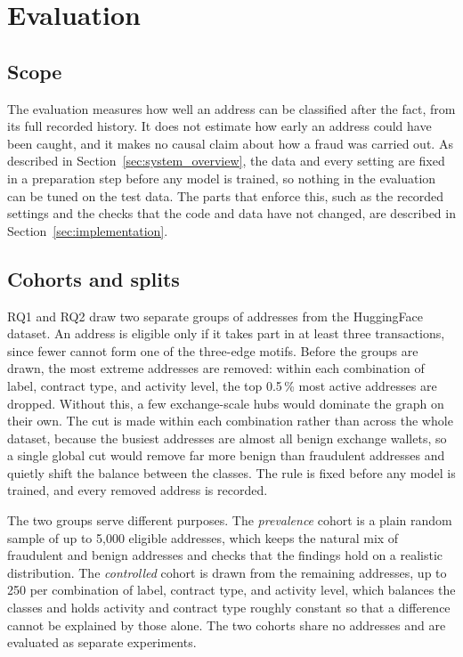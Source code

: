 \documentclass{thesisclass}
\begin{document}
\section{Evaluation}
\label{sec:evaluation_protocol}

\subsection{Scope}

The evaluation measures how well an address can be classified after the fact, from
its full recorded history. It does not estimate how early an address could have
been caught, and it makes no causal claim about how a fraud was carried out. As
described in Section~\ref{sec:system_overview}, the data and every setting are
fixed in a preparation step before any model is trained, so nothing in the
evaluation can be tuned on the test data. The parts that enforce this, such as the
recorded settings and the checks that the code and data have not changed, are
described in Section~\ref{sec:implementation}.

\subsection{Cohorts and splits}

RQ1 and RQ2 draw two separate groups of addresses from the HuggingFace dataset. An
address is eligible only if it takes part in at least three transactions, since
fewer cannot form one of the three-edge motifs. Before the groups are drawn, the
most extreme addresses are removed: within each combination of label, contract
type, and activity level, the top 0.5\,\% most active addresses are dropped.
Without this, a few exchange-scale hubs would dominate the graph on their own. The
cut is made within each combination rather than across the whole dataset, because
the busiest addresses are almost all benign exchange wallets, so a single global
cut would remove far more benign than fraudulent addresses and quietly shift the
balance between the classes. The rule is fixed before any model is trained, and
every removed address is recorded.

The two groups serve different purposes. The \emph{prevalence} cohort is a plain
random sample of up to 5{,}000 eligible addresses, which keeps the natural mix of
fraudulent and benign addresses and checks that the findings hold on a realistic
distribution. The \emph{controlled} cohort is drawn from the remaining addresses,
up to 250 per combination of label, contract type, and activity level, which
balances the classes and holds activity and contract type roughly constant so that
a difference cannot be explained by those alone. The two cohorts share no
addresses and are evaluated as separate experiments.
\end{document}
